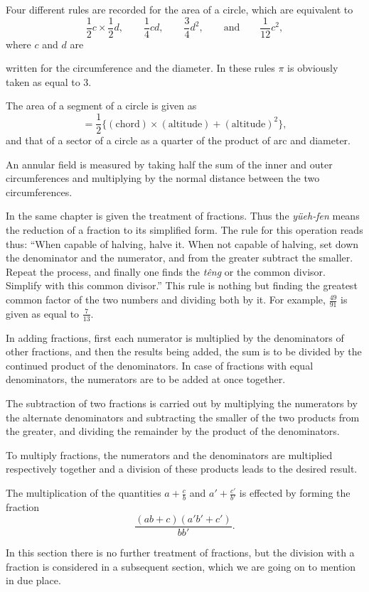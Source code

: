 \documentclass[11pt]{article}
\newcommand{\scanpage}[2]{\clearpage\setcounter{footnote}{0}\noindent{\footnotesize\color{gray}PDF page #1 · #2}\par\medskip}
\newcommand{\scanfooter}{}
\begin{document}
Four different rules are recorded for the area of a circle, which are equivalent to
\[
\frac12 c\times \frac12 d,\qquad \frac14 cd,\qquad \frac34 d^2,\qquad \text{and}\qquad \frac1{12}c^2,
\]
where $c$ and $d$ are
\scanfooter

\scanpage{0025}{Chapter 3, printed page 11}
written for the circumference and the diameter. In these rules $\pi$ is obviously taken as equal to 3.

The area of a segment of a circle is given as
\[
=\frac12\{(\text{chord})\times(\text{altitude})+(\text{altitude})^2\},
\]
and that of a sector of a circle as a quarter of the product of arc and diameter.

An annular field is measured by taking half the sum of the inner and outer circumferences and multiplying by the normal distance between the two circumferences.

In the same chapter is given the treatment of fractions. Thus the \emph{yüeh-fen} means the reduction of a fraction to its simplified form. The rule for this operation reads thus: ``When capable of halving, halve it. When not capable of halving, set down the denominator and the numerator, and from the greater subtract the smaller. Repeat the process, and finally one finds the \emph{têng} or the common divisor. Simplify with this common divisor.'' This rule is nothing but finding the greatest common factor of the two numbers and dividing both by it. For example, $\frac{49}{91}$ is given as equal to $\frac{7}{13}$.

In adding fractions, first each numerator is multiplied by the denominators of other fractions, and then the results being added, the sum is to be divided by the continued product of the denominators. In case of fractions with equal denominators, the numerators are to be added at once together.

The subtraction of two fractions is carried out by multiplying the numerators by the alternate denominators and subtracting the smaller of the two products from the greater, and dividing the remainder by the product of the denominators.

To multiply fractions, the numerators and the denominators are multiplied respectively together and a division of these products leads to the desired result.

The multiplication of the quantities $a+\frac cb$ and $a'+\frac{c'}{b'}$ is effected by forming the fraction
\[
\frac{(ab+c)(a'b'+c')}{bb'}.
\]

In this section there is no further treatment of fractions, but the division with a fraction is considered in a subsequent section, which we are going on to mention in due place.
\end{document}
